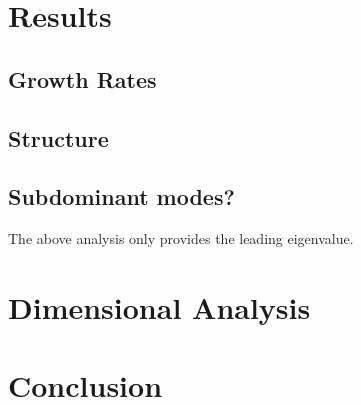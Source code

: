 \section{Results}

\subsection{Growth Rates}
\subsection{Structure}
\subsection{Subdominant modes?} 
The above analysis only provides the leading eigenvalue. 
\section{Dimensional Analysis}

\section{Conclusion}

